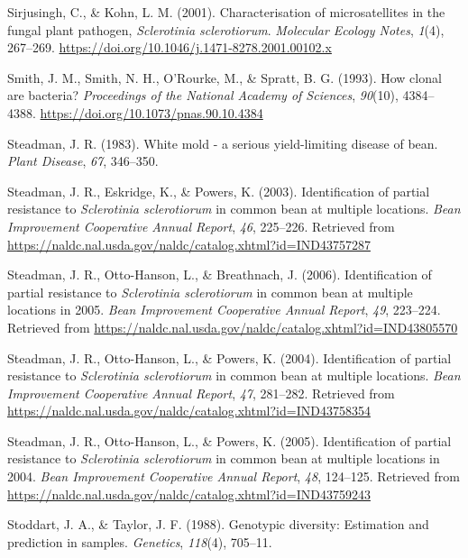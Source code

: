 \hypertarget{ref-sirjusingh2001characterisation}{}
Sirjusingh, C., \& Kohn, L. M. (2001). Characterisation of
microsatellites in the fungal plant pathogen, \emph{Sclerotinia
sclerotiorum}. \emph{Molecular Ecology Notes}, \emph{1}(4), 267--269.
\url{https://doi.org/10.1046/j.1471-8278.2001.00102.x}

\hypertarget{ref-smith1993how}{}
Smith, J. M., Smith, N. H., O'Rourke, M., \& Spratt, B. G. (1993). How
clonal are bacteria? \emph{Proceedings of the National Academy of
Sciences}, \emph{90}(10), 4384--4388.
\url{https://doi.org/10.1073/pnas.90.10.4384}

\hypertarget{ref-steadman1983white}{}
Steadman, J. R. (1983). White mold - a serious yield-limiting disease of
bean. \emph{Plant Disease}, \emph{67}, 346--350.

\hypertarget{ref-steadman2003identification}{}
Steadman, J. R., Eskridge, K., \& Powers, K. (2003). Identification of
partial resistance to \emph{Sclerotinia sclerotiorum} in common bean at
multiple locations. \emph{Bean Improvement Cooperative Annual Report},
\emph{46}, 225--226. Retrieved from
\url{https://naldc.nal.usda.gov/naldc/catalog.xhtml?id=IND43757287}

\hypertarget{ref-steadman2006identification}{}
Steadman, J. R., Otto-Hanson, L., \& Breathnach, J. (2006).
Identification of partial resistance to \emph{Sclerotinia sclerotiorum}
in common bean at multiple locations in 2005. \emph{Bean Improvement
Cooperative Annual Report}, \emph{49}, 223--224. Retrieved from
\url{https://naldc.nal.usda.gov/naldc/catalog.xhtml?id=IND43805570}

\hypertarget{ref-steadman2004identification}{}
Steadman, J. R., Otto-Hanson, L., \& Powers, K. (2004). Identification
of partial resistance to \emph{Sclerotinia sclerotiorum} in common bean
at multiple locations. \emph{Bean Improvement Cooperative Annual
Report}, \emph{47}, 281--282. Retrieved from
\url{https://naldc.nal.usda.gov/naldc/catalog.xhtml?id=IND43758354}

\hypertarget{ref-steadman2005identification}{}
Steadman, J. R., Otto-Hanson, L., \& Powers, K. (2005). Identification
of partial resistance to \emph{Sclerotinia sclerotiorum} in common bean
at multiple locations in 2004. \emph{Bean Improvement Cooperative Annual
Report}, \emph{48}, 124--125. Retrieved from
\url{https://naldc.nal.usda.gov/naldc/catalog.xhtml?id=IND43759243}

\hypertarget{ref-stoddart1988genotypic}{}
Stoddart, J. A., \& Taylor, J. F. (1988). Genotypic diversity:
Estimation and prediction in samples. \emph{Genetics}, \emph{118}(4),
705--11.

